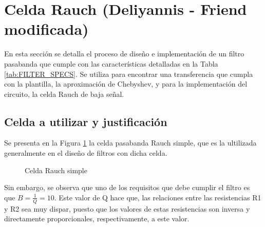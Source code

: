\section{Celda Rauch (Deliyannis - Friend modificada)}
En esta secci\'on se detalla el proceso de dise\~no e implementaci\'on de un filtro pasabanda que cumple con las caracter\'isticas detalladas en la Tabla \ref{tab:FILTER_SPECS}. Se utiliza para encontrar una transferencia que cumpla con la plantilla, la aproximaci\'on de Chebyshev, y para la implementaci\'on del circuito, la celda Rauch de baja se\~nal.
\begin{table}[H]
    \centering

    \caption{Par\'ametros de diseño para el filtro a implementar}
    \label{tab:FILTER_SPECS}
    \end{table}
\subsection{Celda a utilizar y justificaci\'on}
Se presenta en la Figura \ref{fig:RAUCH_SIMPLE} la celda pasabanda Rauch simple, que es la ultilizada generalmente en el dise\~no de filtros con dicha celda. 
\begin{figure}[H]
    \centering
    \caption{Celda Rauch simple}
    \label{fig:RAUCH_SIMPLE}
\end{figure}
Sin embargo, se observa que uno de los requisitos que debe cumplir el filtro es que $B = \frac{1}{Q} = 10$. Este valor de Q hace que,  las relaciones entre las resistencias R1 y R2 sea muy dispar, puesto que los valores de estas resistencias son inversa y directamente proporcionales, respectivamente, a este valor.

